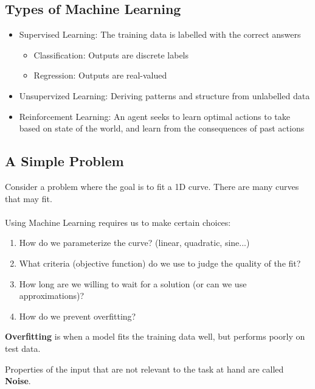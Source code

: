 \documentclass[12pt]{article}
\begin{document}
\subsection*{Types of Machine Learning}
\begin{itemize}
  \item Supervised Learning: The training data is labelled with the correct answers
  \begin{itemize}
    \item Classification: Outputs are discrete labels
    \item Regression: Outputs are real-valued
  \end{itemize}
  \item Unsupervized Learning: Deriving patterns and structure from unlabelled data
  \item Reinforcement Learning: An agent seeks to learn optimal actions to take based on state of the world, and learn from the consequences of past actions
\end{itemize}

\subsection{A Simple Problem}
Consider a problem where the goal is to fit a 1D curve. There are many curves that may fit.
\\
\\
Using Machine Learning requires us to make certain choices:

\begin{enumerate}
  \item How do we parameterize the curve? (linear, quadratic, sine...)
  \item What criteria (objective function) do we use to judge the quality of the fit?
  \item How long are we willing to wait for a solution (or can we use approximations)?
  \item How do we prevent overfitting?
\end{enumerate}

\textbf{Overfitting} is when a model fits the training data well, but performs poorly on test data.

Properties of the input that are not relevant to the task at hand are called \textbf{Noise}.
\end{document}
